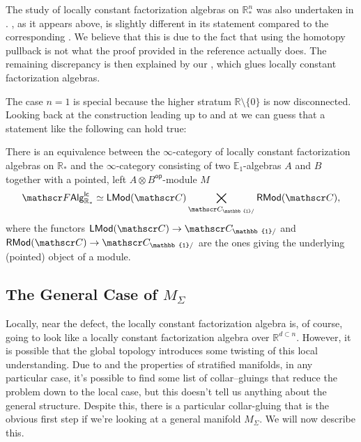 \documentclass[../text.tex]{subfiles}
\begin{document}
\begin{remark}
    The study of locally constant factorization algebras on $\mathbb{R}^n_*$ was also undertaken in \cite[sec.6.3]{ginot2015}. , as it appears above, is slightly different in its statement compared to the corresponding \cite[cor.8]{ginot2015}. We believe that this is due to the fact that using the homotopy pullback is not what the proof provided in the reference actually does. The remaining discrepancy is then explained by our , which glues locally constant factorization algebras.
\end{remark}

\begin{remark}
    The case $n=1$ is special because the higher stratum $\mathbb{R} \setminus \{0\}$ is now disconnected. Looking back at the construction leading up to  and at  we can guess that a statement like the following can hold true:
\end{remark}

\begin{proposition}
    There is an equivalence between the $\infty$-category of locally constant factorization algebras on $\mathbb{R}_*$ and the $\infty$-category consisting of two $\mathbb{E}_1$-algebras $A$ and $B$ together with a pointed, left $A \otimes B^\mathsf{op}$-module $M$
    \begin{equation}
        \lcfa_{\mathbb{R}_*} \simeq \mathsf{LMod} (\catC) \bigtimes_{\catC_{\mathbb{1}/}} \mathsf{RMod} (\catC),
    \end{equation}
    where the functors $\mathsf{LMod}(\catC) \rightarrow \catC_{\mathbb{1}/}$ and $\mathsf{RMod}(\catC) \rightarrow \catC_{\mathbb{1}/}$ are the ones giving the underlying (pointed) object of a module.
\end{proposition}



\subsection{The General Case of \texorpdfstring{$M_{\Sigma}$}{M Sigma}}

Locally, near the defect, the locally constant factorization algebra is, of course, going to look like a locally constant factorization algebra over $\mathbb{R}^{d \subset n}$. However, it is possible that the global topology introduces some twisting of this local understanding. Due to  and the properties of stratified manifolds, in any particular case, it's possible to find some list of collar--gluings that reduce the problem down to the local case, but this doesn't tell us anything about the general structure. Despite this, there is a particular collar-gluing that is the obvious first step if we're looking at a general manifold $M_\Sigma$. We will now describe this.
\end{document}
